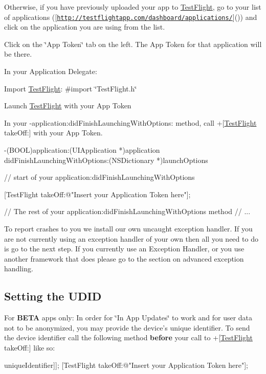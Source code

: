 \begin{DoxyEnumerate}
\begin{DoxyEnumerate}
Otherwise, if you have previously uploaded your app to \hyperlink{interface_test_flight}{Test\-Flight}, go to your list of applications (\mbox{[}\href{http://testflightapp.com/dashboard/applications/}{\tt http\-://testflightapp.\-com/dashboard/applications/}\mbox{]}()) and click on the application you are using from the list.
\item Click on the \char`\"{}\-App Token\char`\"{} tab on the left. The App Token for that application will be there.
\end{DoxyEnumerate}
\item In your Application Delegate\-:
\begin{DoxyEnumerate}
\item Import \hyperlink{interface_test_flight}{Test\-Flight}\-: {\ttfamily \#import \char`\"{}\-Test\-Flight.\-h\char`\"{}}
\item Launch \hyperlink{interface_test_flight}{Test\-Flight} with your App Token

In your {\ttfamily -\/application\-:did\-Finish\-Launching\-With\-Options\-:} method, call {\ttfamily +\mbox{[}\hyperlink{interface_test_flight}{Test\-Flight} take\-Off\-:\mbox{]}} with your App Token. \begin{DoxyVerb}-(BOOL)application:(UIApplication *)application 
    didFinishLaunchingWithOptions:(NSDictionary *)launchOptions {
  // start of your application:didFinishLaunchingWithOptions 

  [TestFlight takeOff:@"Insert your Application Token here"];

  // The rest of your application:didFinishLaunchingWithOptions method
  // ...
}
\end{DoxyVerb}

\item To report crashes to you we install our own uncaught exception handler. If you are not currently using an exception handler of your own then all you need to do is go to the next step. If you currently use an Exception Handler, or you use another framework that does please go to the section on advanced exception handling.
\end{DoxyEnumerate}
\end{DoxyEnumerate}

\subsection*{Setting the U\-D\-I\-D}

For {\bfseries B\-E\-T\-A} apps only\-: In order for \char`\"{}\-In App Updates\char`\"{} to work and for user data not to be anonymized, you may provide the device's unique identifier. To send the device identifier call the following method {\bfseries before} your call to {\ttfamily +\mbox{[}\hyperlink{interface_test_flight}{Test\-Flight} take\-Off\-:\mbox{]}} like so\-: \begin{DoxyVerb}[TestFlight setDeviceIdentifier:[[UIDevice currentDevice] uniqueIdentifier]];
[TestFlight takeOff:@"Insert your Application Token here"];
\end{DoxyVerb}


